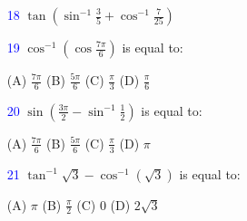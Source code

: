 \documentclass[a4paper,12pt]{article}                                                                       \usepackage{amsmath, amssymb, xcolor, tcolorbox}                                                            \usepackage{geometry}
\begin{document}
\begin{enumerate}                                                                                      \item[\textcolor{blue}{18}] $\tan \left( \sin^{-1} \frac{3}{5} + \cos^{-1} \frac{7}{25} \right)$
    \item[\textcolor{blue}{19}] $\cos^{-1} \left( \cos \frac{7\pi}{6} \right)$ is equal to:
    \begin{tabbing}
        (A) \( \frac{7\pi}{6} \) \hspace{1cm} (B) \( \frac{5\pi}{6} \) \hspace{1cm} (C) \( \frac{\pi}{3} \) \hspace{1cm} (D) \( \frac{\pi}{6} \)
    \end{tabbing}
                                                                                                                \item[\textcolor{blue}{20}] $\sin \left( \frac{3\pi}{2} - \sin^{-1} \frac{1}{2} \right)$ is equal to:
    \begin{tabbing}                                                                                                 (A) $\frac{7\pi}{6}$ \hspace{1cm} (B) $\frac{5\pi}{6}$ \hspace{1cm} (C) $\frac{\pi}{3}$ \hspace{1cm} (D) $\pi$
    \end{tabbing}

    \item[\textcolor{blue}{21}] $\tan^{-1} \sqrt{3} - \cos^{-1} (\sqrt{3})$ is equal to:
    \begin{tabbing}
        (A) $\pi$ \hspace{1cm} (B) $\frac{\pi}{2}$ \hspace{1cm} (C) $0$ \hspace{1cm} (D) $2\sqrt{3}$
    \end{tabbing}
\end{enumerate}
\end{document}
